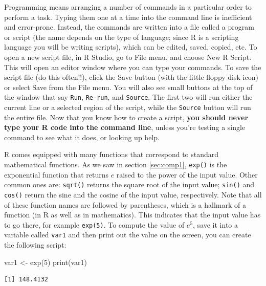 \documentclass[
  letterpaper,
  DIV=11,
  numbers=noendperiod]{scrreprt}
\newenvironment{Shaded}{\begin{snugshade}}{\end{snugshade}}
\newcommand{\DecValTok}[1]{\textcolor[rgb]{0.68,0.00,0.00}{#1}}
\newcommand{\FunctionTok}[1]{\textcolor[rgb]{0.28,0.35,0.67}{#1}}
\newcommand{\NormalTok}[1]{\textcolor[rgb]{0.00,0.23,0.31}{#1}}
\newcommand{\OtherTok}[1]{\textcolor[rgb]{0.00,0.23,0.31}{#1}}
\begin{document}
Programming means arranging a number of commands in a particular order
to perform a task. Typing them one at a time into the command line is
inefficient and error-prone. Instead, the commands are written into a
file called a program or script (the name depends on the type of
language; since R is a scripting language you will be writing scripts),
which can be edited, saved, copied, etc. To open a new script file, in R
Studio, go to File menu, and choose New R Script. This will open an
editor window where you can type your commands. To save the script file
(do this often!!), click the Save button (with the little floppy disk
icon) or select Save from the File menu. You will also see small buttons
at the top of the window that say \texttt{Run}, \texttt{Re-run}, and
\texttt{Source}. The first two will run either the current line or a
selected region of the script, while the \texttt{Source} button will run
the entire file. Now that you know how to create a script, \textbf{you
should never type your R code into the command line}, unless you're
testing a single command to see what it does, or looking up help.

R comes equipped with many 
 functions that correspond to standard
mathematical functions. As we saw in section \ref{sec:comp1},
\texttt{exp()} is the exponential function that returns \(e\) raised to
the power of the input value. Other common ones are: \texttt{sqrt()}
returns the square root of the input value; \texttt{sin()} and
\texttt{cos()} return the sine and the cosine of the input value,
respectively. Note that all of these function names are followed by
parentheses, which is a hallmark of a function (in R as well as in
mathematics). This indicates that the input value has to go there, for
example \texttt{exp(5)}. To compute the value of \(e^5\), save it into a
variable called \texttt{var1} and then print out the value on the
screen, you can create the following script:

\begin{Shaded}
\begin{Highlighting}[]
\NormalTok{var1 }\OtherTok{\textless{}{-}} \FunctionTok{exp}\NormalTok{(}\DecValTok{5}\NormalTok{)}
\FunctionTok{print}\NormalTok{(var1)}
\end{Highlighting}
\end{Shaded}

\begin{verbatim}
[1] 148.4132
\end{verbatim}
\end{document}
